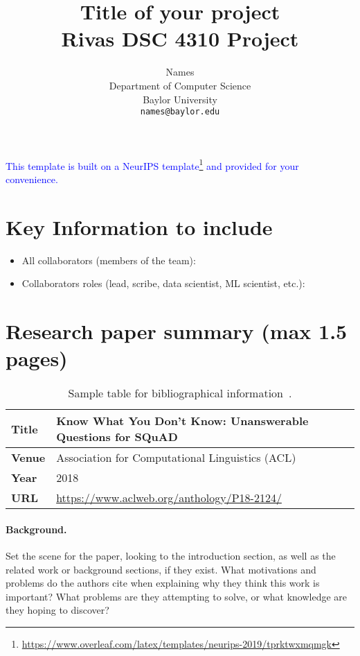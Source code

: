 \documentclass{article}
\title{
  Title of your project \\
  \vspace{1em}
  \small{\normalfont Rivas  DSC 4310 Project} 
}
\author{
  Names \\
  Department of Computer Science \\
  Baylor University \\
  \texttt{names@baylor.edu} \\
}
\newcommand{\note}[1]{\textcolor{blue}{{#1}}}
\begin{document}
\maketitle



\note{This template is built on a NeurIPS template\footnote{\url{https://www.overleaf.com/latex/templates/neurips-2019/tprktwxmqmgk}} and provided for your convenience.}


\section{Key Information to include}

\begin{itemize}
    \item All collaborators (members of the team):
    \item Collaborators roles (lead, scribe, data scientist, ML scientist, etc.):
\end{itemize}


\section{Research paper summary (max 1.5 pages)}

\begin{table}[h]
    \centering
    \begin{tabular}{ll}
        \toprule
        \textbf{Title} & Know What You Don't Know: Unanswerable Questions for SQuAD \\
        \midrule
        \textbf{Venue} & Association for Computational Linguistics (ACL) \\
        \textbf{Year}  & 2018 \\
        \textbf{URL}   & \url{https://www.aclweb.org/anthology/P18-2124/} \\
        \bottomrule
    \end{tabular}
    \vspace{1em}
    \caption{Sample table for bibliographical information~\cite{rajpurkar2018know}.}
\end{table}

\paragraph{Background.}
Set the scene for the paper, looking to the introduction section, as well as the related work or background sections, if they exist.
What motivations and problems do the authors cite when explaining why they think this work is important? 
What problems are they attempting to solve, or what knowledge are they hoping to discover?
\end{document}
